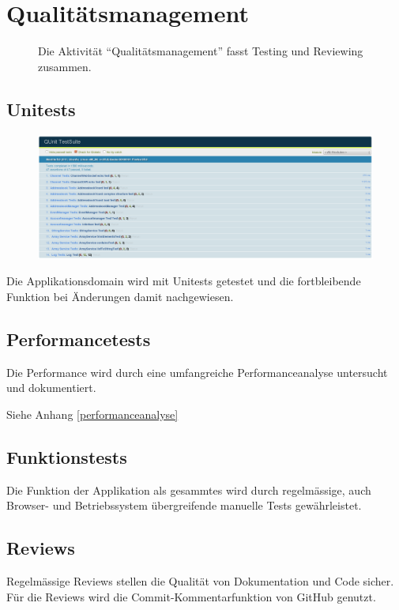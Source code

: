\chapter{Qualitätsmanagement}
	\begin{figure}[H]
		\centering
		{\tiny
		}
		\caption{Die Aktivität ``Qualitätsmanagement'' fasst Testing und Reviewing zusammen.}
	\end{figure}


	\section{Unitests}		
		\begin{figure}[H]
			\centering
			\includegraphics[width=1\textwidth]{../qualityManagement/unittesting.png}
			\label{unittests}
		\end{figure}
		Die Applikationsdomain wird mit Unitests getestet und die fortbleibende Funktion bei Änderungen damit nachgewiesen.
		
	\section{Performancetests}
		Die Performance wird durch eine umfangreiche Performanceanalyse untersucht und dokumentiert.
		
		Siehe Anhang \ref{performanceanalyse}
		
	\section{Funktionstests}
		Die Funktion der Applikation als gesammtes wird durch regelmässige, auch Browser- und Betriebssystem übergreifende manuelle Tests gewährleistet.
		
	\section{Reviews}
		Regelmässige Reviews stellen die Qualität von Dokumentation und Code sicher. Für die Reviews wird die Commit-Kommentarfunktion von GitHub genutzt.
